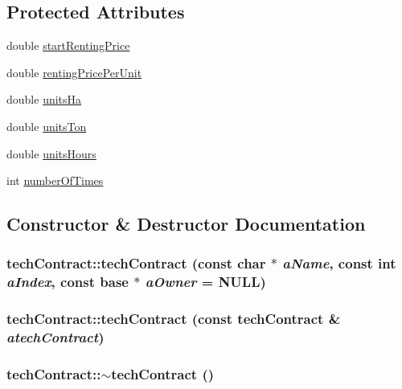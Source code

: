 \subsection*{Protected Attributes}
\begin{DoxyCompactItemize}
\item 
double \hyperlink{classtech_contract_a9f51881d288139fffafcb6eca7f9af18}{startRentingPrice}
\item 
double \hyperlink{classtech_contract_a83a67b6e6467122eb41670db55f80901}{rentingPricePerUnit}
\item 
double \hyperlink{classtech_contract_a615d6a868249343b35dfc8b65b0760d5}{unitsHa}
\item 
double \hyperlink{classtech_contract_af0b9071cc8e4057c7d6d90e2482ffb4d}{unitsTon}
\item 
double \hyperlink{classtech_contract_a3b4ef6c2c518af353ee50e34330f7f7b}{unitsHours}
\item 
int \hyperlink{classtech_contract_a3d3a810c51af5b158d9e3300813d4a95}{numberOfTimes}
\end{DoxyCompactItemize}


\subsection{Constructor \& Destructor Documentation}
\hypertarget{classtech_contract_af151d2d9b742eb285dc482e6b5eacadc}{
\subsubsection[{techContract}]{\setlength{\rightskip}{0pt plus 5cm}techContract::techContract (const char $\ast$ {\em aName}, \/  const int {\em aIndex}, \/  const {\bf base} $\ast$ {\em aOwner} = {\ttfamily NULL})}}
\label{classtech_contract_af151d2d9b742eb285dc482e6b5eacadc}
\hypertarget{classtech_contract_aa2076d20695bcdd353d3883c0e051510}{
\subsubsection[{techContract}]{\setlength{\rightskip}{0pt plus 5cm}techContract::techContract (const {\bf techContract} \& {\em atechContract})}}
\label{classtech_contract_aa2076d20695bcdd353d3883c0e051510}
\hypertarget{classtech_contract_a1eb9a1c86d82f75d8c808871c3a790b0}{
\subsubsection[{$\sim$techContract}]{\setlength{\rightskip}{0pt plus 5cm}techContract::$\sim$techContract ()}}
\label{classtech_contract_a1eb9a1c86d82f75d8c808871c3a790b0}


